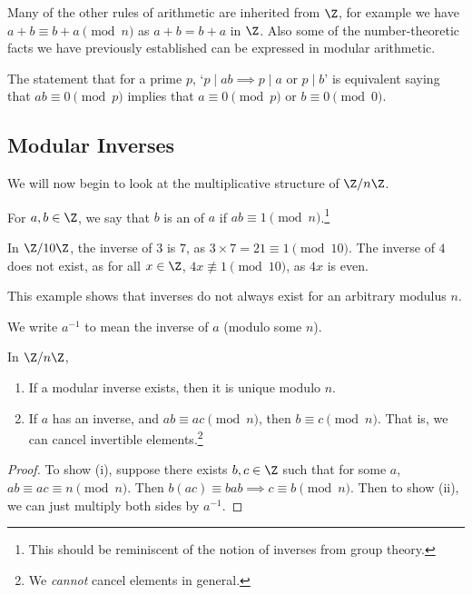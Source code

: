 \documentclass[a4paper]{scrreprt}
\begin{document}
Many of the other rules of arithmetic are inherited from $\Z$, for example we have $a + b \equiv b+a \pmod{n}$ as $a + b = b + a$ in $\Z$. Also some of the number-theoretic facts we have previously established can be expressed in modular arithmetic.

\begin{example}
	The statement that for a prime $p$, `$p \mid ab \implies p \mid a$ or $p \mid b$' is equivalent saying that $ab \equiv 0 \pmod{p}$ implies that $a \equiv 0 \pmod{p}$ or $b \equiv 0 \pmod{0}$.
\end{example}

\subsection{Modular Inverses}

We will now begin to look at the multiplicative structure of $\Z/n\Z$. 

\begin{definition}
	For $a, b \in \Z$, we say that $b$ is an  of $a$ if $ab \equiv 1 \pmod{n}$.\footnote{This should be reminiscent of the notion of inverses from group theory.}
\end{definition}

\begin{example}
	In $\Z/10\Z$, the inverse of $3$ is $7$, as $3\times 7 = 21\equiv 1 \pmod{10}$. The inverse of $4$ does not exist, as for all $x \in \Z$, $4x \not\equiv 1 \pmod{10}$, as $4x$ is even.

	This example shows that inverses do not always exist for an arbitrary modulus $n$.
\end{example}

\begin{notation}
	We write $a^{-1}$ to mean the inverse of $a$ (modulo some $n$).
\end{notation}

\begin{proposition}
	In $\Z/n\Z$,
	\begin{enumerate}[label=(\roman*)]
		\item If a modular inverse exists, then it is unique modulo $n$.
		\item If $a$ has an inverse, and $ab \equiv ac \pmod{n}$, then $b \equiv c \pmod{n}$. That is, we can cancel invertible elements.\footnote{We \emph{cannot} cancel elements in general.}
	\end{enumerate}
\end{proposition}
\begin{proof}
	To show (i),
	suppose there exists $b, c \in \Z$ such that for some $a$, $ab \equiv ac \equiv n \pmod{n}$. Then $b(ac) \equiv bab \implies c \equiv b \pmod{n}$. Then to show (ii), we can just multiply both sides by $a^{-1}$.
\end{proof}
\end{document}

